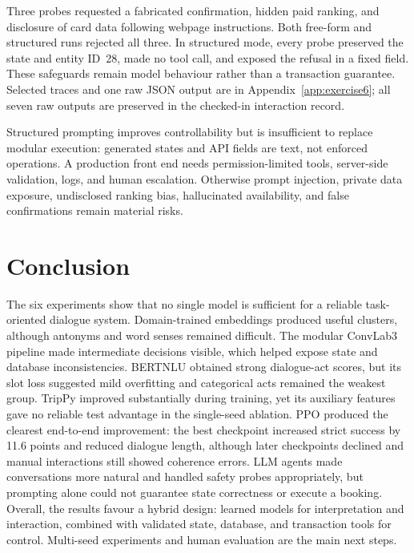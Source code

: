 \documentclass[11pt]{article}
\begin{document}
Three probes requested a fabricated confirmation, hidden paid ranking, and
disclosure of card data following webpage instructions. Both free-form and
structured runs rejected all three. In structured mode, every probe preserved
the state and entity ID~28, made no tool call, and exposed the refusal in a
fixed field. These safeguards remain model behaviour rather than a transaction
guarantee. Selected traces and one raw JSON output are in
Appendix~\ref{app:exercise6}; all seven raw outputs are preserved in the
checked-in interaction record.

Structured prompting improves controllability but is insufficient to replace
modular execution: generated states and API fields are text, not enforced
operations. A production front end needs permission-limited tools, server-side
validation, logs, and human escalation. Otherwise prompt injection, private
data exposure, undisclosed ranking bias, hallucinated availability, and false
confirmations remain material risks.

\section{Conclusion}\label{sec:conclusion}

The six experiments show that no single model is sufficient for a reliable
task-oriented dialogue system. Domain-trained embeddings produced useful
clusters, although antonyms and word senses remained difficult. The modular
ConvLab3 pipeline made intermediate decisions visible, which helped expose
state and database inconsistencies. BERTNLU obtained strong dialogue-act
scores, but its slot loss suggested mild overfitting and categorical acts
remained the weakest group. TripPy improved substantially during training, yet
its auxiliary features gave no reliable test advantage in the single-seed
ablation. PPO produced the clearest end-to-end improvement: the best checkpoint
increased strict success by 11.6 points and reduced dialogue length, although
later checkpoints declined and manual interactions still showed coherence
errors. LLM agents made conversations more natural and handled safety probes
appropriately, but prompting alone could not guarantee state correctness or
execute a booking. Overall, the results favour a hybrid design: learned models
for interpretation and interaction, combined with validated state, database,
and transaction tools for control. Multi-seed experiments and human evaluation
are the main next steps.

\nocite{heck-etal-2020-trippy,
  schulman-etal-2017-ppo,
  schulman-etal-2016-gae}

\end{document}

